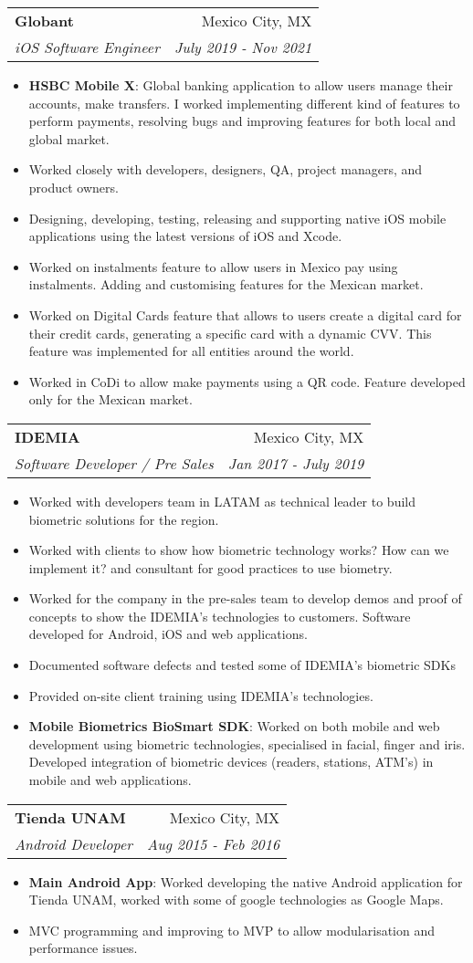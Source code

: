 \documentclass[letterpaper,11pt]{article}
\makeatletter
\newcommand{\resumeItem}[2]{
  \item\small{
    \textbf{#1}{: #2 \vspace{-2pt}}
  }
}
\newcommand{\resumeItemSimple}[1]{
  \item\small{
    {#1}
  }
}
\newcommand{\resumeSubheading}[4]{
  \vspace{-1pt}\item
    \begin{tabular*}{0.97\textwidth}{l@{\extracolsep{\fill}}r}
      \textbf{#1} & #2 \\
      \textit{\small#3} & \textit{\small #4} \\
    \end{tabular*}\vspace{-5pt}
}
\newcommand{\resumeItemListStart}{\begin{itemize}}
\newcommand{\resumeItemListEnd}{\end{itemize}\vspace{-5pt}}
\makeatother
\begin{document}
    \resumeSubheading
      {Globant}{Mexico City, MX}
      {iOS Software Engineer}{July 2019 - Nov 2021}
      \resumeItemListStart
        \resumeItem{HSBC Mobile X}{Global banking application to allow users manage their accounts, make transfers. I worked implementing different kind of features to perform payments, resolving bugs and improving features for both local and global market.}
        \resumeItemSimple{Worked closely with developers, designers, QA, project managers, and product owners.}
        \resumeItemSimple{Designing, developing, testing, releasing and supporting native iOS mobile applications using the latest versions of iOS and Xcode.}
        \resumeItemSimple
          {Worked on instalments feature to allow users in Mexico pay using instalments. Adding and customising features for the Mexican market.}
        \resumeItemSimple
          {Worked on Digital Cards feature that allows to users create a digital card for their credit cards, generating a specific card with a dynamic CVV. This feature was implemented for all entities around the world.}
        \resumeItemSimple
          {Worked in CoDi to allow make payments using a QR code. Feature developed only for the Mexican market.}
      \resumeItemListEnd
      
      \resumeSubheading
      {IDEMIA}{Mexico City, MX}
      {Software Developer / Pre Sales}{Jan 2017 - July 2019}
      \resumeItemListStart
        \resumeItemSimple
        {Worked with developers team in LATAM as technical leader to build biometric solutions for the region.}
        \resumeItemSimple
        {Worked with clients to show how biometric technology works? How can we implement it? and consultant for good practices to use biometry.}
        \resumeItemSimple
        {Worked for the company in the pre-sales team to develop demos and proof of concepts to show the IDEMIA’s technologies to customers. Software developed for Android, iOS and web applications.}
        \resumeItemSimple
        {Documented software defects and tested some of IDEMIA’s biometric SDKs}
        \resumeItemSimple
        {Provided on-site client training using IDEMIA’s technologies.}
        \resumeItem{Mobile Biometrics BioSmart SDK}
          {Worked on both mobile and web development using biometric technologies, specialised in facial, finger and iris. Developed integration of biometric devices (readers, stations, ATM’s) in mobile and web applications.}
      \resumeItemListEnd
      
      \resumeSubheading
      {Tienda UNAM}{Mexico City, MX}
      {Android Developer}{Aug 2015 - Feb 2016}
      \resumeItemListStart
        \resumeItem{Main Android App}
          {Worked developing the native Android application for Tienda UNAM, worked with some of google technologies as Google Maps.}
          \resumeItemSimple{MVC programming and improving to MVP to allow modularisation and performance issues.}
      \resumeItemListEnd
      
\end{document}
